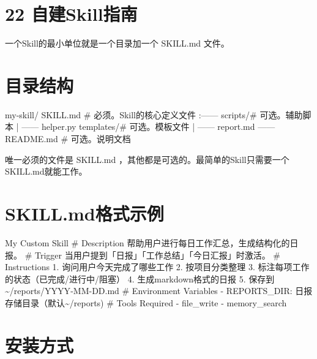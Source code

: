 \documentclass[
  10
]{article}
\newenvironment{Shaded}{}{}
\newcommand{\NormalTok}[1]{#1}
\begin{document}
\section{22 自建Skill指南}\label{ux81eaux5efaskillux6307ux5357}

一个Skill的最小单位就是一个目录加一个 SKILL.md 文件。

\section{目录结构}\label{ux76eeux5f55ux7ed3ux6784-1}

\begin{Shaded}
\begin{Highlighting}[]
\NormalTok{my{-}skill/ SKILL.md \# 必须。Skill的核心定义文件 :—— scripts/\# 可选。辅助脚本 | —— helper.py templates/\# 可选。模板文件 | —— report.md —— README.md \# 可选。说明文档}
\end{Highlighting}
\end{Shaded}

唯一必须的文件是 SKILL.md
，其他都是可选的。最简单的Skill只需要一个SKILL.md就能工作。

\section{SKILL.md格式示例}\label{skill.mdux683cux5f0fux793aux4f8b}

\begin{Shaded}
\begin{Highlighting}[]
\NormalTok{My Custom Skill  }
\NormalTok{\# Description  }
\NormalTok{帮助用户进行每日工作汇总，生成结构化的日报。  }
\NormalTok{\# Trigger  }
\NormalTok{当用户提到「日报」「工作总结」「今日汇报」时激活。  }
\NormalTok{\# Instructions  }
\NormalTok{1. 询问用户今天完成了哪些工作  }
\NormalTok{2. 按项目分类整理  }
\NormalTok{3. 标注每项工作的状态（已完成/进行中/阻塞）  }
\NormalTok{4. 生成markdown格式的日报  }
\NormalTok{5. 保存到\textasciitilde{}/reports/YYYY{-}MM{-}DD.md  }
\NormalTok{\# Environment Variables  }
\NormalTok{{-} REPORTS\_DIR: 日报存储目录（默认\textasciitilde{}/reports)  }
\NormalTok{\# Tools Required  }
\NormalTok{{-} file\_write  }
\NormalTok{{-} memory\_search}
\end{Highlighting}
\end{Shaded}

\section{安装方式}\label{ux5b89ux88c5ux65b9ux5f0f}
\end{document}
